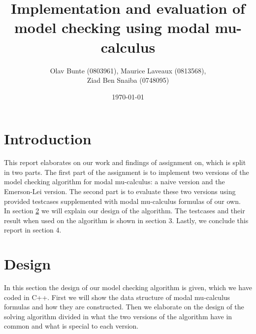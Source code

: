 \documentclass[10pt,a4paper]{article}
\title{Implementation and evaluation of model checking using modal mu-calculus}
\author{Olav Bunte (0803961), Maurice Laveaux (0813568),\\ Ziad Ben Snaiba (0748095)}
\date{\today}
\begin{document}
\maketitle

\section{Introduction}
This report elaborates on our work and findings of assignment on, which is split in two parts. The first part of the assignment is to implement two versions of the model checking algorithm for modal mu-calculus: a naive version and the Emerson-Lei version. The second part is to evaluate these two versions using provided testcases supplemented with modal mu-calculus formulas of our own.\\
In section \ref{design} we will explain our design of the algorithm. The testcases and their result when used on the algorithm is shown in section 3. Lastly, we conclude this report in section 4.

\section{Design}\label{design}
In this section the design of our model checking algorithm is given, which we have coded in C++. First we will show the data structure of modal mu-calculus formulas and how they are constructed. Then we elaborate on the design of the solving algorithm divided in what the two versions of the algorithm have in common and what is special to each version.

\end{document}
